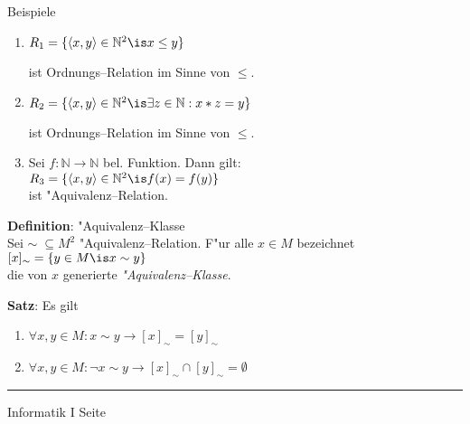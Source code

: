
\begin{slide}{}
\normalsize
\begin{center}
Beispiele
\end{center}
\vspace{0.5cm}

\footnotesize
\begin{enumerate}
\item $R_1 = \{ \langle x, y \rangle \in \mathbb{N}^2 \is x \leq y \}$ 

      ist Ordnungs--Relation im       Sinne von $\leq$.
\item $R_2 = \{ \langle x, y \rangle \in \mathbb{N}^2 \is \exists z \in \mathbb{N}: x * z = y \}$ 

      ist Ordnungs--Relation im       Sinne von $\leq$.

\item Sei $f: \mathbb{N} \rightarrow \mathbb{N}$ bel. Funktion.  Dann gilt: \\[0.3cm]
      \hspace*{1.3cm} $R_3 = \{ \langle x, y \rangle \in \mathbb{N}^2 \is f(x) = f(y) \}$ \\[0.3cm]
      ist "Aquivalenz--Relation.
\end{enumerate}

\textbf{Definition}: "Aquivalenz--Klasse \\[0.3cm]
Sei $\sim\; \subseteq M^2$ "Aquivalenz--Relation. F"ur alle $x \in M$ bezeichnet \\[0.3cm]
\hspace*{1.3cm} $[x]_{\sim} = \{ y \in M \is x \sim y \}$ \\[0.3cm]
die von $x$ generierte \emph{"Aquivalenz--Klasse}.

\textbf{Satz}: Es gilt
\begin{enumerate}
\item $\forall x, y \in M: x \sim y \rightarrow [x]_{\sim} = [y]_{\sim}$
\item $\forall x, y \in M: \neg x \sim y \rightarrow [x]_{\sim} \cap [y]_{\sim} = \emptyset$
\end{enumerate}

\vspace*{\fill}
\tiny \addtocounter{mypage}{1}
\rule{15cm}{1mm}
Informatik I  \hspace*{\fill} Seite 
\end{slide}


